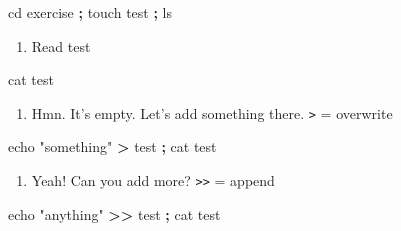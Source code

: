 \documentclass[
]{book}
\newenvironment{Shaded}{\begin{snugshade}}{\end{snugshade}}
\newcommand{\BuiltInTok}[1]{#1}
\newcommand{\FunctionTok}[1]{\textcolor[rgb]{0.00,0.00,0.00}{#1}}
\newcommand{\KeywordTok}[1]{\textcolor[rgb]{0.13,0.29,0.53}{\textbf{#1}}}
\newcommand{\NormalTok}[1]{#1}
\newcommand{\OperatorTok}[1]{\textcolor[rgb]{0.81,0.36,0.00}{\textbf{#1}}}
\newcommand{\StringTok}[1]{\textcolor[rgb]{0.31,0.60,0.02}{#1}}
\providecommand{\tightlist}{%
  \setlength{\itemsep}{0pt}\setlength{\parskip}{0pt}}
\begin{document}
\begin{Shaded}
\begin{Highlighting}[]

\BuiltInTok{cd}\NormalTok{ exercise }\KeywordTok{;} \FunctionTok{touch}\NormalTok{ test }\KeywordTok{;} \FunctionTok{ls} 
\end{Highlighting}
\end{Shaded}

\begin{enumerate}
\def\labelenumi{\arabic{enumi}.}
\setcounter{enumi}{3}
\tightlist
\item
  Read test
\end{enumerate}

\begin{Shaded}
\begin{Highlighting}[]

\FunctionTok{cat}\NormalTok{ test }
\end{Highlighting}
\end{Shaded}

\begin{enumerate}
\def\labelenumi{\arabic{enumi}.}
\setcounter{enumi}{4}
\tightlist
\item
  Hmn. It's empty. Let's add something there. \texttt{\textgreater{}} = overwrite
\end{enumerate}

\begin{Shaded}
\begin{Highlighting}[]

\BuiltInTok{echo} \StringTok{"something"} \OperatorTok{\textgreater{}}\NormalTok{ test }\KeywordTok{;} \FunctionTok{cat}\NormalTok{ test }
\end{Highlighting}
\end{Shaded}

\begin{enumerate}
\def\labelenumi{\arabic{enumi}.}
\setcounter{enumi}{5}
\tightlist
\item
  Yeah! Can you add more? \texttt{\textgreater{}\textgreater{}} = append
\end{enumerate}

\begin{Shaded}
\begin{Highlighting}[]

\BuiltInTok{echo} \StringTok{"anything"} \OperatorTok{\textgreater{}\textgreater{}}\NormalTok{ test }\KeywordTok{;} \FunctionTok{cat}\NormalTok{ test }
\end{Highlighting}
\end{Shaded}
\end{document}
